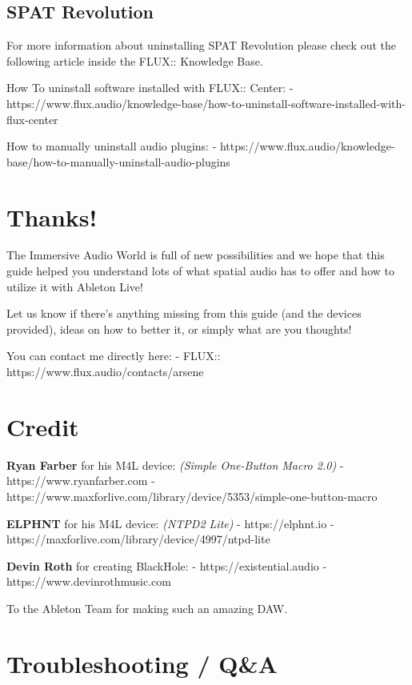 \documentclass[
  letterpaper,
  DIV=11,
  numbers=noendperiod]{scrreport}
\begin{document}
\hypertarget{spat-revolution-1}{%
\subsection{SPAT Revolution}\label{spat-revolution-1}}

For more information about uninstalling SPAT Revolution please check out
the following article inside the FLUX:: Knowledge Base.

How To uninstall software installed with FLUX:: Center: -
https://www.flux.audio/knowledge-base/how-to-uninstall-software-installed-with-flux-center

How to manually uninstall audio plugins: -
https://www.flux.audio/knowledge-base/how-to-manually-uninstall-audio-plugins

\hypertarget{thanks}{%
\section{Thanks!}\label{thanks}}

The Immersive Audio World is full of new possibilities and we hope that
this guide helped you understand lots of what spatial audio has to offer
and how to utilize it with Ableton Live!

Let us know if there's anything missing from this guide (and the devices
provided), ideas on how to better it, or simply what are you thoughts!

You can contact me directly here: - FLUX::
https://www.flux.audio/contacts/arsene

\hypertarget{credit}{%
\section{Credit}\label{credit}}

\textbf{Ryan Farber} for his M4L device: \emph{(Simple One-Button Macro
2.0)} - https://www.ryanfarber.com -
https://www.maxforlive.com/library/device/5353/simple-one-button-macro

\textbf{ELPHNT} for his M4L device: \emph{(NTPD2 Lite)} -
https://elphnt.io - https://maxforlive.com/library/device/4997/ntpd-lite

\textbf{Devin Roth} for creating BlackHole: - https://existential.audio
- https://www.devinrothmusic.com

To the Ableton Team for making such an amazing DAW.

\hypertarget{troubleshooting-qa}{%
\section{Troubleshooting / Q\&A}\label{troubleshooting-qa}}
\end{document}
